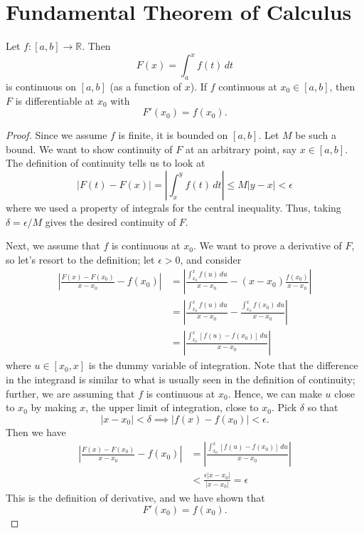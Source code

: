 \section{Fundamental Theorem of Calculus}

\begin{theorem}
Let $f:\left[a,b\right]\rightarrow \mathbb{R}$. Then $$F\left(x\right)= \int_a^x f\left(t\right)\, dt $$ is continuous on $\left[a,b\right]$ (as a function of $x$). If $f$ continuous at $x_0 \in \left[a,b\right]$, then $F$ is differentiable at $x_0$ with $$ F'\left(x_0\right) = f\left(x_0\right).$$
\end{theorem}
\begin{proof}
Since we assume $f$ is finite, it is bounded on $\left[a,b\right]$. Let $M$ be such a bound. We want to show continuity of $F$ at an arbitrary point, say $x \in \left[a,b\right]$. The definition of continuity tells us to look at $$ \left| F\left(t\right) - F\left(x\right)\right| = \left| \int_x^y f\left(t\right)\, dt \right| \leq M \left|y-x\right| < \epsilon $$ where we used a property of integrals for the central inequality. Thus, taking $\delta = \epsilon/M$ gives the desired continuity of $F$.

Next, we assume that $f$ is continuous at $x_0$. We want to prove a derivative of $F$, so let's resort to the definition; let $\epsilon >0$, and consider \begin{align}  \left| \frac{F\left(x\right)-F\left(x_0\right)}{x-x_0} - f\left(x_0\right)\right|  & = \left| \frac{\int_{x_0}^x f\left(u\right)\, du }{x-x_0} - \left(x-x_0\right)\frac{f\left(x_0\right) }{x-x_0}\right| \\ & = \left| \frac{\int_{x_0}^x f\left(u\right)\, du }{x-x_0} - \frac{ \int_{x_0}^x f\left(x_0\right)\, du }{x-x_0}\right| \\ & = \left| \frac{\int_{x_0}^x \left[f\left(u\right) - f\left(x_0\right)\right]\, du }{x-x_0} \right| \end{align} where $u\in \left[x_0, x\right]$ is the dummy variable of integration. Note that the difference in the integrand is similar to what is usually seen in the definition of continuity; further, we are assuming that $f$ is continuous at $x_0$. Hence, we can make $u$ close to $x_0$ by making $x$, the upper limit of integration, close to $x_0$. Pick $\delta$ so that $$ \left|x-x_0\right|<\delta \implies \left| f\left(x\right) - f\left(x_0\right)\right| < \epsilon . $$ Then we have \begin{align}  \left| \frac{F\left(x\right)-F\left(x_0\right)}{x-x_0} - f\left(x_0\right)\right|  & = \left| \frac{\int_{x_0}^x \left[f\left(u\right) - f\left(x_0\right)\right]\, du }{x-x_0} \right| \\ & < \frac{\epsilon\left|x-x_0\right|}{\left|x-x_0\right|} = \epsilon \end{align} This is the definition of derivative, and we have shown that $$ F'\left(x_0\right) = f\left(x_0\right).$$ 
\end{proof}


